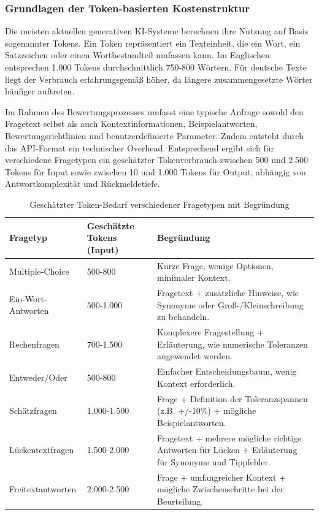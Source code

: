 \documentclass[a4paper,12pt]{article}
\begin{document}
\subsubsection{Grundlagen der Token-basierten Kostenstruktur}
Die meisten aktuellen generativen KI-Systeme berechnen ihre Nutzung auf Basis sogenannter Tokens. Ein Token repräsentiert ein Texteinheit, die ein Wort, ein Satzzeichen oder einen Wortbestandteil umfassen kann. Im Englischen entsprechen 1.000 Tokens durchschnittlich 750-800 Wörtern. Für deutsche Texte liegt der Verbrauch erfahrungsgemäß höher, da längere zusammengesetzte Wörter häufiger auftreten.

Im Rahmen des Bewertungsprozesses umfasst eine typische Anfrage sowohl den Fragetext selbst als auch Kontextinformationen, Beispielantworten, Bewertungsrichtlinien und benutzerdefinierte Parameter. Zudem entsteht durch das API-Format ein technischer Overhead. Entsprechend ergibt sich für verschiedene Fragetypen ein geschätzter Tokenverbrauch zwischen 500 und 2.500 Tokens für Input sowie zwischen 10 und 1.000 Tokens für Output, abhängig von Antwortkomplexität und Rückmeldetiefe.

\begin{table}[ht]
    \centering
    \small
    \begin{tabular}{|l|l|p{7cm}|}
        \hline
        \textbf{Fragetyp} & \textbf{Geschätzte Tokens (Input)} & \textbf{Begründung} \\
        \hline
        Multiple-Choice & 500-800 & Kurze Frage, wenige Optionen, minimaler Kontext. \\
        \hline
        Ein-Wort-Antworten & 500-1.000 & Fragetext + zusätzliche Hinweise, wie Synonyme oder Groß-/Kleinschreibung zu behandeln. \\
        \hline
        Rechenfragen & 700-1.500 & Komplexere Fragestellung + Erläuterung, wie numerische Toleranzen angewendet werden. \\
        \hline
        Entweder/Oder & 500-800 & Einfacher Entscheidungsbaum, wenig Kontext erforderlich. \\
        \hline
        Schätzfragen & 1.000-1.500 & Frage + Definition der Toleranzspannen (z.B. +/-10\%) + mögliche Beispielantworten. \\
        \hline
        Lückentextfragen & 1.500-2.000 & Fragetext + mehrere mögliche richtige Antworten für Lücken + Erläuterung für Synonyme und Tippfehler. \\
        \hline
        Freitextantworten & 2.000-2.500 & Frage + umfangreicher Kontext + mögliche Zwischenschritte bei der Beurteilung. \\
        \hline
    \end{tabular}
    \caption{Geschätzter Token-Bedarf verschiedener Fragetypen mit Begründung}
    \label{tab:tokenbedarf-fragetypen}
\end{table}
\end{document}
